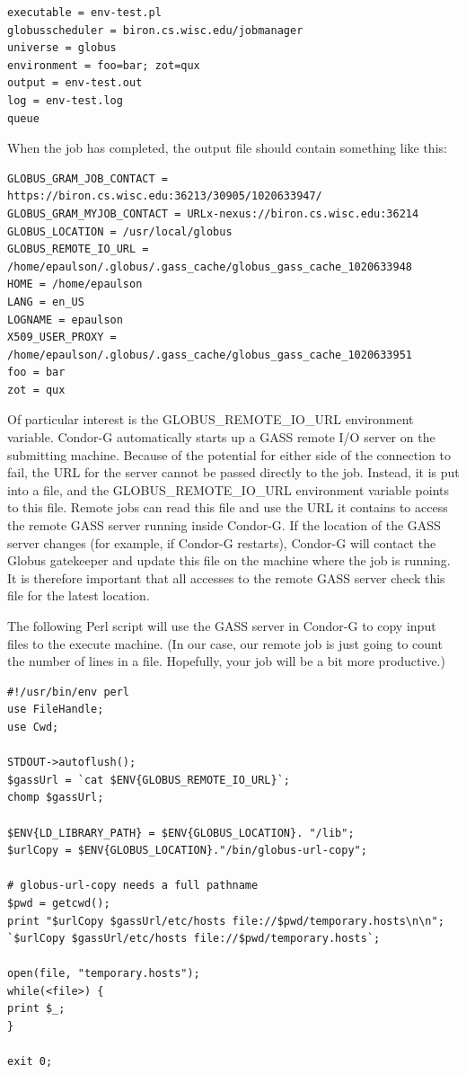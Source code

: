 \begin{verbatim}
executable = env-test.pl
globusscheduler = biron.cs.wisc.edu/jobmanager
universe = globus
environment = foo=bar; zot=qux
output = env-test.out
log = env-test.log
queue
\end{verbatim}

When the job has completed, the output file 
should contain something like this:

\begin{verbatim}
GLOBUS_GRAM_JOB_CONTACT = https://biron.cs.wisc.edu:36213/30905/1020633947/
GLOBUS_GRAM_MYJOB_CONTACT = URLx-nexus://biron.cs.wisc.edu:36214
GLOBUS_LOCATION = /usr/local/globus
GLOBUS_REMOTE_IO_URL = /home/epaulson/.globus/.gass_cache/globus_gass_cache_1020633948
HOME = /home/epaulson
LANG = en_US
LOGNAME = epaulson
X509_USER_PROXY = /home/epaulson/.globus/.gass_cache/globus_gass_cache_1020633951
foo = bar
zot = qux
\end{verbatim}


Of particular interest is the GLOBUS\_REMOTE\_IO\_URL environment variable.
Condor-G automatically starts up a GASS remote I/O
server on the submitting machine.
Because of the potential for either side of the connection to fail,
the URL for the server cannot be passed directly to the job.
Instead, it is put into a file, and the GLOBUS\_REMOTE\_IO\_URL
environment variable points to this file. 
Remote jobs can read this file and use the URL it contains
to access the remote GASS server running inside Condor-G.
If the location
of the GASS server changes (for example, if Condor-G restarts),
Condor-G will contact the Globus gatekeeper and update this file on
the machine where the job is running.
It is therefore important that all accesses to
the remote GASS server check this file for the latest location.

The following Perl script will use the GASS server in Condor-G
to copy input files to the execute machine.
(In our case, our remote job
is just going to count the number of lines in a file.
Hopefully, your job will be a bit more productive.)

\begin{verbatim}
#!/usr/bin/env perl
use FileHandle;
use Cwd;

STDOUT->autoflush();
$gassUrl = `cat $ENV{GLOBUS_REMOTE_IO_URL}`;
chomp $gassUrl;

$ENV{LD_LIBRARY_PATH} = $ENV{GLOBUS_LOCATION}. "/lib";
$urlCopy = $ENV{GLOBUS_LOCATION}."/bin/globus-url-copy";

# globus-url-copy needs a full pathname
$pwd = getcwd();
print "$urlCopy $gassUrl/etc/hosts file://$pwd/temporary.hosts\n\n";
`$urlCopy $gassUrl/etc/hosts file://$pwd/temporary.hosts`;

open(file, "temporary.hosts");
while(<file>) {
print $_;
}

exit 0;
\end{verbatim}

